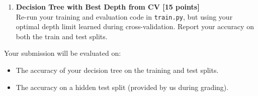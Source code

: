 \begin{enumerate}
    \item \textbf{Decision Tree with Best Depth from CV [15 points]}\\
        Re-run your training and evaluation code in \texttt{train.py}, but using your optimal depth limit learned during cross-validation.
        Report your accuracy on both the train and test splits.
   

\end{enumerate}

Your submission will be evaluated on:

\begin{itemize}\itemsep0em
    \item The accuracy of your decision tree on the training and test splits.
    \item The accuracy on a hidden test split (provided by us during grading).
\end{itemize}
